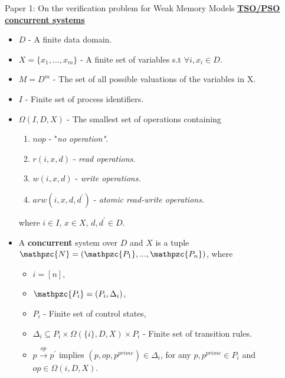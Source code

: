\documentclass[9pt]{beamer}
\begin{document}
\begin{frame}{Paper 1: On the verification problem for Weak Memory Models}
\underline{\textbf{TSO/PSO concurrent systems}}
\begin{itemize}
\item $D$ - A finite data domain.
\item $X = \{x_1,...,x_m\}$ - A finite set of variables s.t $\forall i, x_i \in D$.
\item $M = D^m$ - The set of all possible valuations of the variables in X.
\item $I$ - Finite set of process identifiers.
\item $\Omega(I,D,X)$ - The smallest set of operations containing
	\begin{enumerate}
	\item $nop$ - "\em{no operation}".
	\item $r(i,x,d)$ - \em{read operations}.
	\item $w(i,x,d)$ - \em{write operations}.
	\item $arw(i,x,d,d^{\prime})$ - \em{atomic read-write operations}.
	\end{enumerate}
	where $i \in I$, $x \in X$, $d,d^{\prime} \in D$.
\pause
\item A \textbf{concurrent} system over $D$ and $X$ is a tuple $\mathpzc{N} = 
      (\mathpzc{P_1},...,\mathpzc{P_n})$, where 
	\begin{itemize}
	\item $i=[n]$,
	\item $\mathpzc{P_i} = (P_i, \Delta_i)$,
	\item $P_i$ - Finite set of control states,
	\item $\Delta_i \subseteq P_i \times \Omega(\{i\}, D, X) \times P_i$ - Finite
	      set of transition rules.
	\item $p \overset{op}{\longrightarrow} p^{\prime}$ implies $(p, op, p^{prime}) \in \Delta_i$,
		    for any $p, p^{prime} \in P_i$ and $op \in \Omega({i}, D, X)$.
	\end{itemize}
\end{itemize}
\end{frame}
\end{document}
